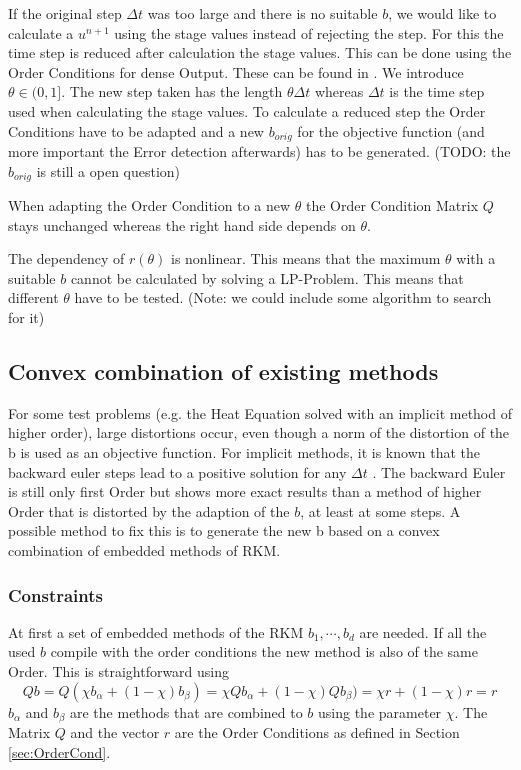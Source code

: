 \documentclass[a4paper]{scrartcl}
\numberwithin{equation}{section}
\theoremstyle{plain}
\theoremstyle{definition}
\numberwithin{theorem}{section}
\newcommand{\dt}{{\Delta t}}
\newcommand{\1}{\mathbbm{1}}
\begin{document}
If the original step $\dt$ was too large and there is no suitable $b$, we would like to calculate a $u^{n+1}$ using the stage values instead of rejecting the step. For this the time step is reduced after calculation the stage values. This can be done using the Order Conditions for dense Output. These can be found in \cite{hairer_runge-kutta_1993}.
We introduce $\theta \in (0,1]$. The new step taken has the length $\theta \dt$ whereas $\dt$ is the time step used when calculating the stage values.
To calculate a reduced step the Order Conditions have to be adapted and a new $b_{orig}$ for the objective function (and more important the Error detection afterwards) has to be generated. 
(TODO: the $b_{orig}$ is still a open question)

When adapting the Order Condition to a new $\theta$ the Order Condition Matrix $Q$ stays unchanged whereas the right hand side depends on $\theta$.

The dependency of $r(\theta)$ is nonlinear. This means that the maximum $\theta$ with a suitable $b$ cannot be calculated by solving a LP-Problem. This means that different $\theta$ have to be tested. 
(Note: we could include some algorithm to search for it)

\subsection{Convex combination of existing methods}\label{sec:convex}
For some test problems (e.g. the Heat Equation solved with an implicit method of higher order), large distortions occur, even though a norm of the distortion of the b is used as an objective function. 
For implicit methods, it is known that the backward euler steps lead to a positive solution for any $\dt$ \cite{hundsdorfer_numerical_2003}. The backward Euler is still only first Order but shows more exact results than a method of higher Order that is distorted by the adaption of the $b$, at least at some steps. 
A possible method to fix this is to generate the new b based on a convex combination of embedded methods of RKM. 

\subsubsection{Constraints}
At first a set of embedded methods of the RKM $b_1,\cdots,b_d$ are needed. 
If all the used $b$ compile with the order conditions the new method is also of the same Order.
This is straightforward using
$$ Q b = Q (\chi b_{\alpha} + (1-\chi) b_{\beta}) = \chi Q  b_{\alpha} + (1-\chi) Q b_{\beta}) = \chi r + (1-\chi) r = r$$
$b_{\alpha}$ and $b_{\beta}$ are the methods that are combined to $b$ using the parameter $\chi$. The Matrix $Q$ and the vector $r$ are the Order Conditions as defined in Section\,\ref{sec:OrderCond}.
\end{document}
